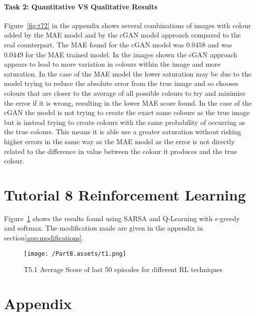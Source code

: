 \documentclass[10pt,twocolumn,letterpaper]{article}
\begin{document}
\paragraph{Task 2: Quantitative VS Qualitative Results}

Figure~\ref*{fig:t72} in the appendix shows several combinations of images with colour added by the MAE model and by the cGAN model approach compared to the real counterpart. The MAE found for the cGAN model was $0.0458$ and was $0.0449$ for the MAE trained model. In the images shown the cGAN approach appears to lead to more variation in colours within the image and more saturation. In the case of the MAE model the lower saturation may be due to the model trying to reduce the absolute error from the true image and so chooses colours that are closer to the average of all possible colours to try and minimise the error if it is wrong, resulting in the lower MAE score found. In the case of the cGAN the model is not trying to create the exact same colours as the true image but is instead trying to create colours with the same probability of occurring as the true colours\cite{gan}. This means it is able use a greater saturation without risking higher errors in the same way as the MAE model as the error is not directly related to the difference in value between the colour it produces and the true colour.

\section{Tutorial 8 Reinforcement Learning}

Figure~\ref*{fig:t81} shows the results found using SARSA and Q-Learning with $\epsilon$-greedy and softmax. The modification made are given in the appendix in section\ref*{app:modifications}.
\begin{figure}[ht]
    \begin{center}
        \texttt{[image: /Part8.assets/t1.png]}
        \caption{T5.1 Average Score of last 50 episodes for different RL techniques}\label{fig:t81}
    \end{center}
\end{figure}

\clearpage

{\small
    
    
}

\section{Appendix}
\end{document}
